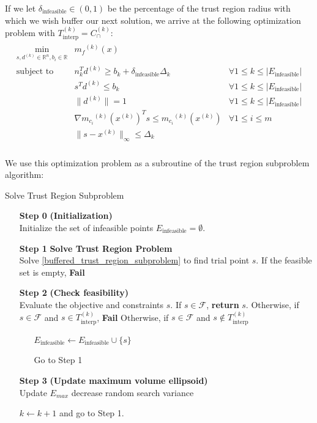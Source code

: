 \documentclass{article}
\theoremstyle{case}
\newcommand{\capcones}{{C^{(k)}_{\cap}}}
\newcommand{\dk}{\Delta_k}
\newcommand{\feasible}{{\mathcal F}}
\newcommand{\mcik}{{{m}_{c_i}}^{(k)}}
\newcommand{\mfk}{{{m}_f}^{(k)}}
\newcommand{\reals}{\mathbb R}
\newcommand{\Rn}{\mathbb R^n}
\newcommand{\sampletrk}{{T_{\text{interp}}^{(k)}}}
\newcommand{\trsinfset}{{E_\text{infeasible}}}
\newcommand{\trstol}{{\delta_\text{infeasible}}}
\newcommand{\xk}{{x^{(k)}}}
\begin{document}
If we let $\trstol \in (0, 1)$ be the percentage of the trust region radius with which we wish buffer our next solution, 
we arrive at the following optimization problem with $\sampletrk = \capcones$:
\begin{align}
\label{buffered_trust_region_subproblem}
\begin{array}{ccc}
\min_{s, d^{(k)} \in \Rn, b_i \in \reals}	& \mfk(x) & 	\\
 \mbox{subject to}  & n_k^Td^{(k)} \ge b_k + \trstol \dk& \forall 1 \le k \le |\trsinfset | \\
 & s^T d^{(k)} \le b_k &   \forall 1 \le k \le |\trsinfset |  \\
 & \|d^{(k)}\| = 1 & \forall 1 \le k \le |\trsinfset |	\\
 & \nabla \mcik(\xk) ^T s \le \mcik(\xk) & \forall 1 \le i \le m\\
 & \|s - \xk \|_{\infty} \le \dk & \\
\end{array}
\end{align}

We use this optimization problem as a subroutine of the trust region subproblem algorithm:

\begin{algorithm}[H]
    \caption{Solve Trust Region Subproblem}
    \label{linear_cut_trust_region_subproblem}
    \begin{itemize}
        \item[\textbf{Step 0}] \textbf{(Initialization)} \\
	    Initialize the set of infeasible points $\trsinfset = \emptyset$.
        
        \item[\textbf{Step 1}] \textbf{Solve Trust Region Problem} \\
	    Solve \cref{buffered_trust_region_subproblem} to find trial point $s$.
	    If the feasible set is empty, \textbf{Fail}
        
        \item[\textbf{Step 2}] \textbf{(Check feasibility)} \\
            Evaluate the objective and constraints $s$.
            If $s\in\feasible$, \textbf{return} $s$.
            Otherwise, if $s\in\feasible$ and $s \in \sampletrk$, \textbf{Fail}
	    Otherwise, if $s\in\feasible$ and $s \not \in \sampletrk$ \begin{itemize}
	    	\item[] $\trsinfset \gets \trsinfset \cup \{s\}$
	    	\item[] Go to Step 1
	    \end{itemize}
            
        \item[\textbf{Step 3}] \textbf{(Update maximum volume ellipsoid)} \\
	    Update $E_{max}$
	    decrease random search variance
            
        $k \gets k+1$ and go to Step 1.
    \end{itemize}
\end{algorithm}
\end{document}
